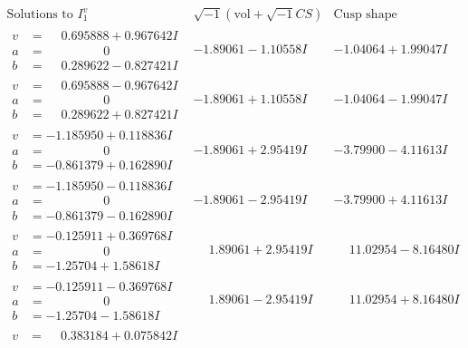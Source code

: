 \documentclass[1p]{elsarticle_modified}
\theoremstyle{definition}
\newcommand{\I}{\sqrt{-1}}
\begin{document}
$$\begin{array}{c|c|c}  
\text{Solutions to }I^v_{1}& \I (\text{vol} + \sqrt{-1}CS) & \text{Cusp shape}\\
 \hline 
\begin{aligned}
v &= \phantom{-}0.695888 + 0.967642 I \\
a &= \phantom{-0.000000 } 0 \\
b &= \phantom{-}0.289622 - 0.827421 I\end{aligned}
 & -1.89061 - 1.10558 I & -1.04064 + 1.99047 I \\ \hline\begin{aligned}
v &= \phantom{-}0.695888 - 0.967642 I \\
a &= \phantom{-0.000000 } 0 \\
b &= \phantom{-}0.289622 + 0.827421 I\end{aligned}
 & -1.89061 + 1.10558 I & -1.04064 - 1.99047 I \\ \hline\begin{aligned}
v &= -1.185950 + 0.118836 I \\
a &= \phantom{-0.000000 } 0 \\
b &= -0.861379 + 0.162890 I\end{aligned}
 & -1.89061 + 2.95419 I & -3.79900 - 4.11613 I \\ \hline\begin{aligned}
v &= -1.185950 - 0.118836 I \\
a &= \phantom{-0.000000 } 0 \\
b &= -0.861379 - 0.162890 I\end{aligned}
 & -1.89061 - 2.95419 I & -3.79900 + 4.11613 I \\ \hline\begin{aligned}
v &= -0.125911 + 0.369768 I \\
a &= \phantom{-0.000000 } 0 \\
b &= -1.25704 + 1.58618 I\end{aligned}
 & \phantom{-}1.89061 + 2.95419 I & \phantom{-}11.02954 - 8.16480 I \\ \hline\begin{aligned}
v &= -0.125911 - 0.369768 I \\
a &= \phantom{-0.000000 } 0 \\
b &= -1.25704 - 1.58618 I\end{aligned}
 & \phantom{-}1.89061 - 2.95419 I & \phantom{-}11.02954 + 8.16480 I \\ \hline\begin{aligned}
v &= \phantom{-}0.383184 + 0.075842 I \\

\end{aligned}
\end{array}$$
\end{document}
